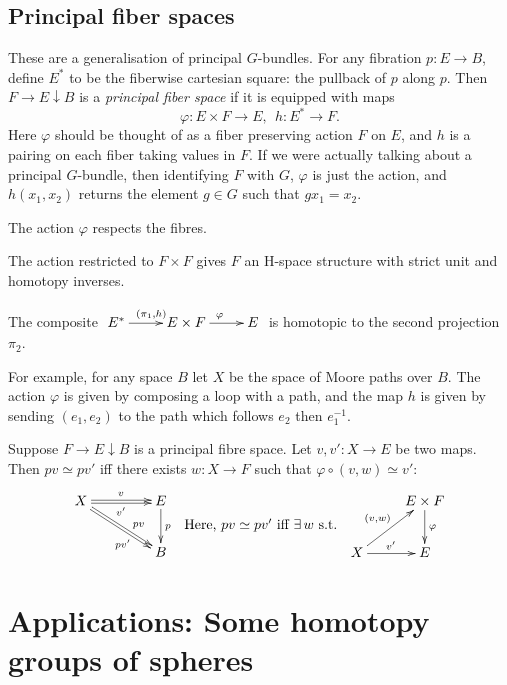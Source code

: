 \documentclass[11pt]{article}
\begin{document}
\subsection{Principal fiber spaces}
These are a generalisation of principal $G$-bundles. For any fibration $p:E\to B$, define $E^*$ to be the fiberwise cartesian square: the pullback of $p$ along $p$. Then $F\rightarrow E\downarrow B$ is a \emph{principal fiber space} if it is equipped with maps 
\[\varphi:E\times F\to E,\ \ h:E^*\to F.\]
Here $\varphi$ should be thought of as a fiber preserving action $F$ on $E$, and $h$ is a pairing on each fiber taking values in $F$. If we were actually talking about a principal $G$-bundle, then identifying $F$ with $G$, $\varphi$ is just the action, and $h(x_1,x_2)$ returns the element $g\in G$ such that $gx_1=x_2$.
\begin{itemise}
\item The action $\varphi$ respects the fibres.
\item The action restricted to $F\times F$ gives $F$ an H-space structure with strict unit and homotopy inverses.
\item The composite $\xymatrix{E^*\ar[r]^{(\pi_1,h)}&E\times F\ar[r]^{\varphi}&E}$ is homotopic to the second projection $\pi_2$.
\end{itemise}
For example, for any space $B$ let $X$ be the space of Moore paths over $B$. The action $\varphi$ is given by composing a loop with a path, and the map $h$ is given by sending $(e_1,e_2)$ to the path which follows $e_2$ then $e_1^{-1}$.
\begin{prop*}
Suppose $F\rightarrow E\downarrow B$ is a principal fibre space. Let $v,v':X\to E$ be two maps. Then $pv\simeq pv'$ iff there exists $w:X\to F$ such that $\varphi\circ(v,w)\simeq v'$:
\[\xymatrix@C=1.5cm{
X\ar@<.25ex>[r]^v\ar@<-.25ex>[r]_{v'}\ar@<.25ex>[dr]^(.63){pv}\ar@<-.25ex>[rd]_(.63){pv'}&E\ar[d]^p\\
&B
}\raisebox{-.6cm}{ \ Here, $pv\simeq pv'$ iff $\exists\, w$ s.t.\ \ }
\xymatrix{
&E\times F\ar[d]^\varphi\\
X\ar[ur]^{(v,w)}\ar[r]^{v'}&E
}\]
\end{prop*}

\section{Applications: Some homotopy groups of spheres}
\setcounter{subsection}{1}
\end{document}
